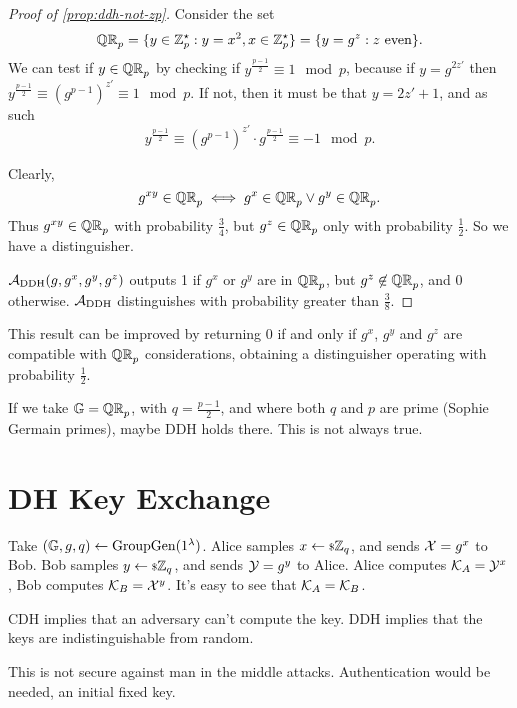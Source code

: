 \begin{proof}[Proof of \cref{prop:ddh-not-zp}]
	Consider the set
	\begin{equation*}
		\mathbb{QR}_{p} = \{ y \in \mathbb{Z}_p^{\star} : y = x^2, x \in \mathbb{Z}_p^{\star} \} = \{ y = g^z : z \text{ even} \}.
	\end{equation*}
	We can test if $y \in \mathbb{QR}_{p}$ by checking if $y^{\frac{p-1}{2}} \equiv 1 \mod p$, because if $y = g^{2z'}$ then $y^{\frac{p-1}{2}} \equiv \left( g^{p-1} \right)^{z'} \equiv 1 \mod p$.
	If not, then it must be that $y = 2 z' + 1$, and as such
	\begin{equation*}
		y^{\frac{p-1}{2}} \equiv \left( g^{p-1} \right)^{z'} \cdot g^{\frac{p-1}{2}} \equiv -1 \mod p.
	\end{equation*}

	Clearly,
	\begin{equation*}
		g^{xy} \in \mathbb{QR}_{p} \iff g^{x} \in \mathbb{QR}_{p} \lor g^y \in \mathbb{QR}_{p}.
	\end{equation*}
	Thus $g^{xy} \in \mathbb{QR}_{p}$ with probability $\frac{3}{4}$, but $g^z \in \mathbb{QR}_{p}$ only with probability $\frac{1}{2}$.
	So we have a distinguisher.

	$\mathcal{A}_{\text{DDH}}(g, g^x, g^y, g^z)$ outputs 1 if $g^x$ or $g^y$ are in $\mathbb{QR}_{p}$, but $g^z \not\in \mathbb{QR}_{p}$, and $0$ otherwise.
	$\mathcal{A}_{\text{DDH}}$ distinguishes with probability greater than $\frac{3}{8}$.
\end{proof}
This result can be improved by returning 0 if and only if $g^x$, $g^y$ and $g^z$ are compatible with $\mathbb{QR}_{p}$ considerations, obtaining a distinguisher operating with probability $\frac{1}{2}$.

If we take $\mathbb{G} = \mathbb{QR}_{p}$, with $q = \frac{p-1}{2}$, and where both $q$ and $p$ are prime (Sophie Germain primes), maybe \ac{DDH} holds there.
This is not always true.

\section{\acl{DH} Key Exchange}

Take $(\mathbb{G} , \allowbreak g , \allowbreak q) \leftarrow \mathrm{GroupGen}(1^{\lambda})$.
Alice samples $x \leftarrow {\scriptstyle \$} {\mathbb{Z}_q}$, and sends $\mathcal{X} = g^x$ to Bob.
Bob samples $y \leftarrow {\scriptstyle \$} {\mathbb{Z}_q}$, and sends $\mathcal{Y} = g^y$ to Alice.
Alice computes $\mathcal{K}_A = \mathcal{Y}^x$, Bob computes $\mathcal{K}_B = \mathcal{X}^y$.
It's easy to see that $\mathcal{K}_A = \mathcal{K}_B$.

\ac{CDH} implies that an adversary can't compute the key.
\ac{DDH} implies that the keys are indistinguishable from random.

This is not secure against man in the middle attacks.
Authentication would be needed, an initial fixed key.

